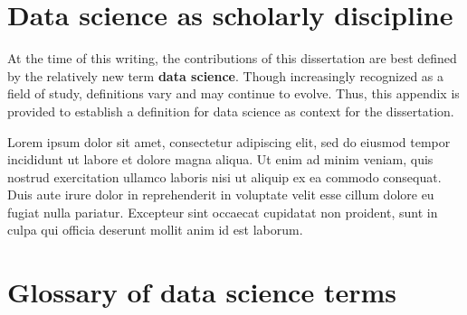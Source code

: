 \begin{appendices}



\chapter{Data science as scholarly discipline}

At the time of this writing, the contributions of this dissertation are best defined by the relatively new term \textbf{data science}. Though increasingly recognized as a field of study, definitions vary and may continue to evolve. Thus, this appendix is provided to establish a definition for data science as context for the dissertation.

Lorem ipsum dolor sit amet, consectetur adipiscing elit, sed do eiusmod tempor incididunt ut labore et dolore magna aliqua. Ut enim ad minim veniam, quis nostrud exercitation ullamco laboris nisi ut aliquip ex ea commodo consequat. Duis aute irure dolor in reprehenderit in voluptate velit esse cillum dolore eu fugiat nulla pariatur. Excepteur sint occaecat cupidatat non proident, sunt in culpa qui officia deserunt mollit anim id est laborum.

\chapter{Glossary of data science terms}


\end{appendices}
